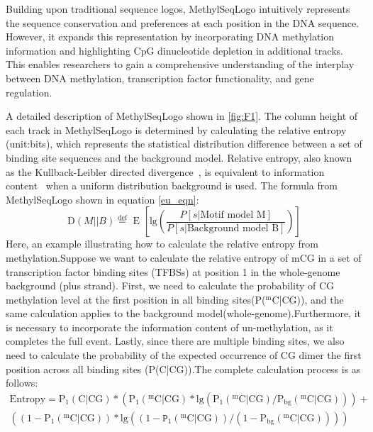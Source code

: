 \documentclass{PHlab-thesis}
\begin{document}
Building upon traditional sequence logos, MethylSeqLogo intuitively represents the sequence conservation and preferences at each position in the DNA sequence. However, it expands this representation by incorporating DNA methylation information and highlighting CpG dinucleotide depletion in additional tracks. This enables researchers to gain a comprehensive understanding of the interplay between DNA methylation, transcription factor functionality, and gene regulation.

A detailed description of MethylSeqLogo shown in \ref{fig:F1}. The column height of each track in MethylSeqLogo is determined by calculating the relative entropy (unit:bits), which represents the statistical distribution difference between a set of binding site sequences and the background model. Relative entropy, also known as the Kullback-Leibler directed divergence~\cite{kullback1951information}, is equivalent to information content~\cite{Information1986} when a uniform distribution background is used. The formula from MethylSeqLogo shown in  equation \ref{eu_eqn}:
\begin{equation} \label{eu_eqn}
	\text{D}(M||B) \overset{\text{def}}{=} \text{ E }\left [ \text{lg}\left (\frac{P[s|\text{Motif model M}]}{P[s|\text{Background model B}]} \right) \right]
\end{equation}
Here, an example illustrating how to calculate the relative entropy from methylation.Suppose we want to calculate the relative entropy of mCG in a set of transcription factor binding sites (TFBSs) at position 1 in the whole-genome background (plus strand). First, we need to calculate the probability of CG methylation level at the first position in all binding sites(P($^{\text{m}}\text{C}$|CG)), and the same calculation applies to the background model(whole-genome).Furthermore, it is necessary to incorporate the information content of un-methylation, as it completes the full event. Lastly, since there are multiple binding sites, we also need to calculate the probability of the expected occurrence of CG dimer the first position across all binding sites (P(C|CG)).The complete calculation process is as follows:
\begin{multline*}
	\text{Entropy} = \text{P}_{1}(\text{C}|\text{CG})*(\text{P}_{1}(^{\text{m}}\text{C}|\text{CG})*\text{lg}(\text{P}_{1}(^{\text{m}}\text{C}|\text{CG})/\text{P}_{\text{bg}}(^{\text{m}}\text{C}|\text{CG})))+\\
((1-\text{P}_{1}(^{\text{m}}\text{C}|\text{CG}))*\text{lg}((1-\texttt{P}_{1}(^{\text{m}}\text{C}|\text{CG}))/(1-\text{P}_{\text{bg}}(^{\text{m}}\text{C}|\text{CG}))))
\end{multline*}
\end{document}
